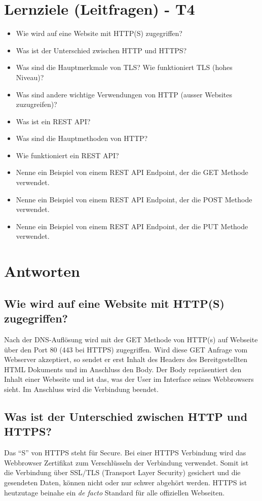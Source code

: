 \section{Lernziele (Leitfragen) - T4}
\begin{itemize}
    \item Wie wird auf eine Website mit HTTP(S) zugegriffen?
    \item Was ist der Unterschied zwischen HTTP und HTTPS?
    \item Was sind die Hauptmerkmale von TLS? Wie funktioniert TLS (hohes Niveau)?
    \item Was sind andere wichtige Verwendungen von HTTP (ausser Websites zuzugreifen)?
    \item Was ist ein REST API?
    \item Was sind die Hauptmethoden von HTTP?
    \item Wie funktioniert ein REST API?
    \item Nenne ein Beispiel von einem REST API Endpoint, der die GET Methode verwendet.
    \item Nenne ein Beispiel von einem REST API Endpoint, der die POST Methode verwendet.
    \item Nenne ein Beispiel von einem REST API Endpoint, der die PUT Methode verwendet.
\end{itemize}

\section{Antworten}
\subsection*{Wie wird auf eine Website mit HTTP(S) zugegriffen?}
Nach der DNS-Auflösung wird mit der GET Methode von HTTP(s) auf Webseite über den Port 80 (443 bei HTTPS) zugegriffen. Wird diese GET Anfrage vom Webserver akzeptiert, so sendet er erst Inhalt des Headers des Bereitgestellten HTML Dokuments und im Anschluss den Body. Der Body repräsentiert den Inhalt einer Webseite und ist das, was der User im Interface seines Webbrowsers sieht. Im Anschluss wird die Verbindung beendet.

\subsection*{Was ist der Unterschied zwischen HTTP und HTTPS?}
Das "`S"' von HTTPS steht für Secure. Bei einer HTTPS Verbindung wird das Webbrowser Zertifikat zum Verschlüsseln der Verbindung verwendet. Somit ist die Verbindung über SSL/TLS (Transport Layer Security) gesichert und die gesendeten Daten, können nicht oder nur schwer abgehört werden. HTTPS ist heutzutage beinahe ein \textsl{de facto} Standard für alle offiziellen Webseiten.

